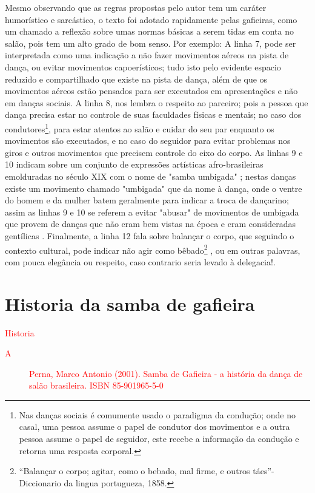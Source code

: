 Mesmo observando que as regras propostas pelo autor tem um caráter humorístico e sarcástico,
o texto foi adotado rapidamente pelas gafieiras, como um chamado a reflexão sobre umas
normas básicas a serem tidas em conta no salão, pois tem um alto grado de bom senso. Por exemplo: 
A linha 7, pode ser interpretada como uma indicação a 
não fazer movimentos aéreos na pista de dança,
ou  evitar movimentos capoerísticos; tudo isto
pelo evidente espacio reduzido e compartilhado que existe na pista de dança, 
além de que os movimentos aéreos estão pensados para ser
executados em apresentações e não em danças sociais. 
A linha 8, nos lembra o respeito ao parceiro; pois a pessoa que dança precisa
estar no controle de suas faculdades físicas e mentais; 
no caso dos condutores\footnote{\label{footlab:conducao}Nas danças sociais é comumente usado o paradigma da condução; 
onde no casal, uma pessoa assume o papel de condutor dos movimentos e 
a outra pessoa assume o papel de seguidor, este recebe a informação da condução e retorna uma resposta corporal.}, 
para estar atentos ao salão e cuidar do seu par enquanto os movimentos são executados, 
e no caso do seguidor para evitar problemas
nos giros e outros movimentos que precisem  controle do eixo do corpo.
As linhas 9 e 10 indicam sobre um conjunto de expressões artísticas 
afro-brasileiras emolduradas no século XIX com o nome de "samba umbigada" \cite[pp. 47]{diniz2008almanaque} \cite[pp. 85]{sandroni2001feitico}; nestas danças existe
um movimento chamado "umbigada" \cite{da2015historia} que da nome à dança, onde o ventre do homem e da mulher batem geralmente para indicar
a troca de dançarino; assim as linhas 9 e 10 se referem a
 evitar "abusar" de movimentos de umbigada que provem de danças que não eram bem vistas na época e eram consideradas gentílicas \cite[pp. 85]{sandroni2001feitico}.
Finalmente,
a linha 12 fala sobre balançar o corpo, que seguindo o contexto cultural, 
pode indicar não agir como bêbado\footnote{``Balançar o corpo; agitar, como o bebado, mal firme, e outros táes''-Diccionario da lingua portugueza, 1858.} \cite[pp.296]{diccionario1858}, ou em outras palavras,
com pouca elegância ou respeito,
caso contrario seria levado à delegacia!.





\section{Historia da samba de gafieira}


\textcolor{red}{Historia
\begin{description}
\item [A] Perna, Marco Antonio (2001). Samba de Gafieira - a história da dança de salão brasileira. ISBN 85-901965-5-0
\end{description}
}




